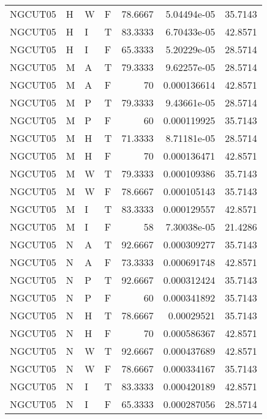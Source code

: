 \begin{table}[htb!]
{\begin{tabular}{llllrrr}
            NGCUT05  & H     & W     & F          & 78.6667    & 5.04494e-05 & 35.7143  \\
            NGCUT05  & H     & I     & T          & 83.3333    & 6.70433e-05 & 42.8571  \\
            NGCUT05  & H     & I     & F          & 65.3333    & 5.20229e-05 & 28.5714  \\
            NGCUT05  & M     & A     & T          & 79.3333    & 9.62257e-05 & 28.5714  \\
            NGCUT05  & M     & A     & F          & 70         & 0.000136614 & 42.8571  \\
            NGCUT05  & M     & P     & T          & 79.3333    & 9.43661e-05 & 28.5714  \\
            NGCUT05  & M     & P     & F          & 60         & 0.000119925 & 35.7143  \\
            NGCUT05  & M     & H     & T          & 71.3333    & 8.71181e-05 & 28.5714  \\
            NGCUT05  & M     & H     & F          & 70         & 0.000136471 & 42.8571  \\
            NGCUT05  & M     & W     & T          & 79.3333    & 0.000109386 & 35.7143  \\
            NGCUT05  & M     & W     & F          & 78.6667    & 0.000105143 & 35.7143  \\
            NGCUT05  & M     & I     & T          & 83.3333    & 0.000129557 & 42.8571  \\
            NGCUT05  & M     & I     & F          & 58         & 7.30038e-05 & 21.4286  \\
            NGCUT05  & N     & A     & T          & 92.6667    & 0.000309277 & 35.7143  \\
            NGCUT05  & N     & A     & F          & 73.3333    & 0.000691748 & 42.8571  \\
            NGCUT05  & N     & P     & T          & 92.6667    & 0.000312424 & 35.7143  \\
            NGCUT05  & N     & P     & F          & 60         & 0.000341892 & 35.7143  \\
            NGCUT05  & N     & H     & T          & 78.6667    & 0.00029521  & 35.7143  \\
            NGCUT05  & N     & H     & F          & 70         & 0.000586367 & 42.8571  \\
            NGCUT05  & N     & W     & T          & 92.6667    & 0.000437689 & 42.8571  \\
            NGCUT05  & N     & W     & F          & 78.6667    & 0.000334167 & 35.7143  \\
            NGCUT05  & N     & I     & T          & 83.3333    & 0.000420189 & 42.8571  \\
            NGCUT05  & N     & I     & F          & 65.3333    & 0.000287056 & 28.5714  \\
            \hline
        \end{tabular}
    }{
    }
\end{table} 
